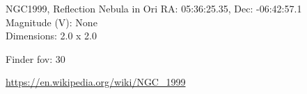 \begin{block}{NGC1999, Reflection Nebula in Ori}
    RA: 05:36:25.35, Dec: -06:42:57.1 \\ 
    Magnitude (V): None \\ 
    Dimensions: 2.0 x 2.0 

    Finder fov: 30 

    \url{https://en.wikipedia.org/wiki/NGC_1999} 
\end{block}